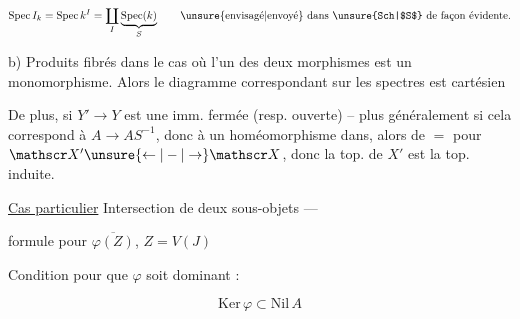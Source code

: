 
\[
\mathrm{Spec}\,I_k=\mathrm{Spec}\,k^I=\coprod_I\underbrace{\mathrm{Spec}(k)}_{S}
\qquad\text{\unsure{envisagé|envoyé} dans \unsure{Sch|$S$} de façon évidente.}
\]

b) Produits fibrés dans le cas où l'un des deux morphismes est un monomorphisme. Alors le diagramme correspondant sur les spectres est cartésien



De plus, si \uline{$Y'\to Y$} est une imm. fermée (resp. ouverte) -- plus généralement si cela correspond à $A\to AS^{-1}$, donc à un homéomorphisme dans, alors  de $=$ pour $\mathscr X'\unsure{\leftarrow|-|\to}\mathscr X$, donc la top. de $X'$ est la top. induite.

\uline{Cas particulier} Intersection de deux sous-objets ---


formule pour $\overline{\varphi(Z)}$, $Z=V(J)$

Condition pour que $\varphi$ soit dominant :

\[
\mathrm{Ker}\,\varphi\subset\mathrm{Nil}\,A
\]

